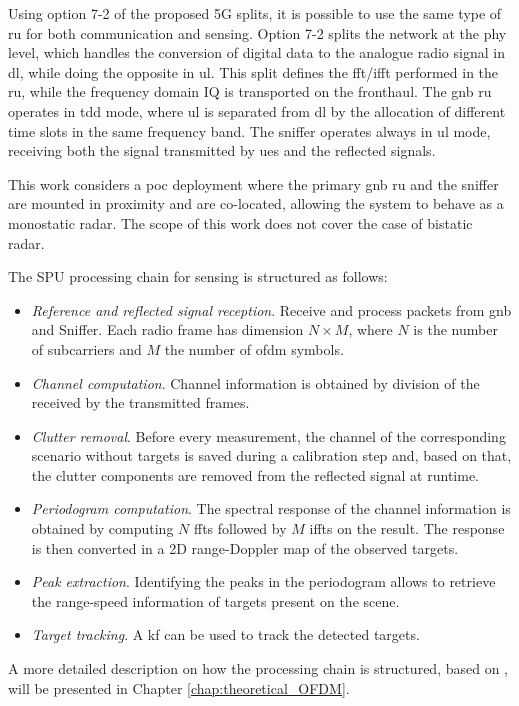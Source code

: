 	Using option 7-2 of the proposed 5G splits, it is possible to use the same type of \gls{ru} for both communication and sensing.
	Option 7-2 splits the network at the \gls{phy} level, which handles the conversion of digital data to the analogue radio signal in \gls{dl}, while doing the opposite in \gls{ul}.
	This split defines the \gls{fft}/\gls{ifft} performed in the \gls{ru}, while the frequency domain IQ is transported on the fronthaul.
	The \gls{gnb} \gls{ru} operates in \gls{tdd} mode, where \gls{ul} is separated from \gls{dl} by the allocation of different time slots in the same frequency band. 	
	The sniffer operates always in \gls{ul} mode, receiving both the signal transmitted by \glspl{ue} and the reflected signals. 
	
	This work considers a \gls{poc} deployment where the primary \gls{gnb} \gls{ru} and the sniffer are mounted in proximity and are co-located, allowing the system to behave as a monostatic radar. 
	The scope of this work does not cover the case of bistatic radar.
	
	The SPU processing chain for sensing is structured as follows:
	
	\begin{itemize}
		\item \textit{Reference and reflected signal reception}. Receive and process packets from \gls{gnb} and Sniffer. Each radio frame has dimension $N\times M$, where $N$ is the number of subcarriers and $M$ the number of \gls{ofdm} symbols.
		\item \textit{Channel computation}. Channel information is obtained by division of the received by the transmitted frames.
		\item \textit{Clutter removal}. Before every measurement, the channel of the corresponding scenario without targets is saved during a calibration step and, based on that, the clutter components are removed from the reflected signal at runtime.
		\item \textit{Periodogram computation}. The spectral response of the channel information is obtained by computing $N$ \glspl{fft} followed by $M$ \glspl{ifft} on the result. The response is then converted in a 2D range-Doppler map of the observed targets. 
		\item \textit{Peak extraction}. Identifying the peaks in the periodogram allows to retrieve the range-speed information of targets present on the scene.
		\item \textit{Target tracking}. A \gls{kf} can be used to track the detected targets. 
	\end{itemize} 
	A more detailed description on how the processing chain is structured,  based on \cite{Braun2014OFDMRA}, will be presented in Chapter \ref{chap:theoretical_OFDM}.
	
